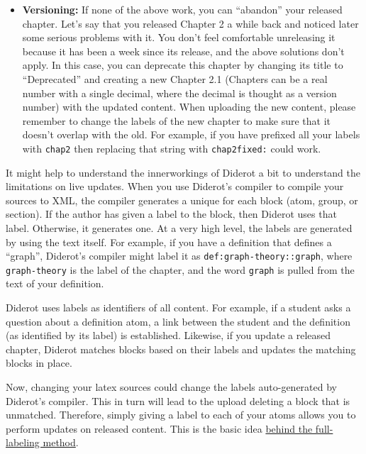 \begin{gram}
\begin{itemize}
\item \textbf{Versioning:} If none of the above work, you can ``abandon'' your released chapter.  Let's say that you released Chapter 2 a while back and noticed later some serious problems with it. You don't feel comfortable unreleasing it because it has been a week since its release, and the above solutions don't apply.  In this case, you can deprecate this chapter by changing its title to ``Deprecated'' and creating a new Chapter 2.1 (Chapters can be a real number with a single decimal, where the decimal is thought as a version number) with the updated content.  When uploading the new content, please remember to change the labels of the new chapter to make sure that it doesn't overlap with the old.  For example, if you have prefixed all your labels with 
%
\lstinline`chap2`
%
then replacing that string with 
%
\lstinline`chap2fixed:` 
%
could work.
\end{itemize}
\end{gram}

\begin{gram}
It might help to understand the innerworkings of Diderot a bit to understand the limitations on live updates.
%
When you use Diderot's compiler to compile your sources to XML, the compiler generates a unique  for each block (atom, group, or section).  
%
If the author has given a label to the block, then Diderot uses that label.
%
Otherwise, it generates one.
%
At a very high level, the labels are generated by using the text itself.  For example, if you have a definition that defines a ``graph'', Diderot's compiler might label it as \lstinline`def:graph-theory::graph`, where  
%
\lstinline`graph-theory` is the label of the chapter,
%
and the word \lstinline`graph` is pulled from the text of your definition.
%

Diderot uses labels as identifiers of all content.
%
For example, if a student asks a question about a definition atom, a link between the student and the definition (as identified by its label) is established.  
%
Likewise, if you update a released chapter, Diderot matches blocks based on their labels and updates the matching blocks in place.

Now, changing your latex sources could change the labels auto-generated by Diderot's compiler.  This in turn will lead to the upload deleting a block that is unmatched.
%
Therefore, simply giving a label to each of your atoms allows you to perform updates on released content.
%
This is the basic idea \href{sec:publish::full-labeling}{behind the full-labeling method}.
\end{gram}

